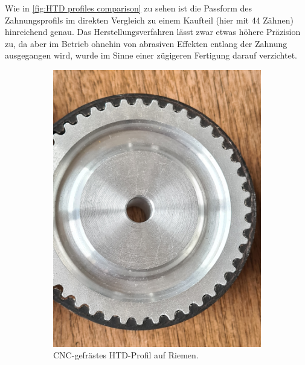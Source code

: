 		Wie in \cref{fig:HTD profiles comparison} zu sehen ist die Passform des Zahnungsprofils im direkten Vergleich zu einem Kaufteil (hier mit 44 Zähnen) hinreichend genau.
		Das Herstellungsverfahren lässt zwar etwas höhere Präzision zu, da aber im Betrieb ohnehin von abrasiven Effekten entlang der Zahnung ausgegangen wird, wurde im Sinne einer zügigeren Fertigung darauf verzichtet.
		\begin{figure}[h]
			\centering
			\begin{subfigure}{.49\textwidth}
				\centering
				\includegraphics[width=\textwidth]{Footage/Pictures/Machined-HTD_tooth_fit.jpg}
				\caption{CNC-gefrästes HTD-Profil auf Riemen.}
				\label{subfig:machined HTD}
			\end{subfigure}
			\hfill
			\begin{subfigure}{.49\textwidth}
				\centering

\end{subfigure}
\end{figure}

